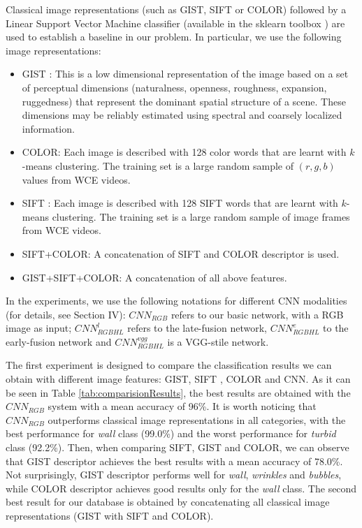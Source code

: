 \documentclass[review,12pt,3p]{elsarticle}
\begin{document}
Classical image representations (such as GIST, SIFT or COLOR) followed by a Linear Support Vector Machine classifier (available in the sklearn toolbox \cite{scikit-learn}) are used to establish a baseline in our problem. In particular, we use the following image representations:
\begin{itemize}
\item GIST \cite{oliva2001modeling}:  This is a low dimensional representation of the image based on a set of perceptual dimensions (naturalness, openness, roughness, expansion, ruggedness) that
represent the dominant spatial structure of a scene. These dimensions may be reliably estimated using spectral and coarsely localized information.
\item COLOR: Each image is described with 128 color words that are learnt with $k$-means clustering. The training set is a large random sample of $(r,g,b)$ values from WCE videos. 
\item SIFT \cite{Lowe_sift}: Each image is described with 128 SIFT words that are learnt with $k$-means clustering. The training set is a large random sample of image frames from WCE videos.
\item SIFT+COLOR: A concatenation of SIFT and COLOR descriptor is used.
\item GIST+SIFT+COLOR: A concatenation of all above features.
\end{itemize}

In the experiments, we use the following notations for different CNN modalities (for details, see Section IV): $CNN_{RGB}$ refers to our basic network, with a RGB image as input; $CNN^l_{RGBHL}$ refers to the late-fusion network, $CNN^e_{RGBHL}$ to the early-fusion network and $CNN^{vgg}_{RGBHL}$ is a VGG-stile network. 

The first experiment is designed to compare the classification results we can obtain with different image features: GIST, SIFT , COLOR and CNN.  As it can be seen in Table \ref{tab:comparisionResults}, the best results are obtained with the $CNN_{RGB}$ system with a mean accuracy of 96\%. It is worth noticing that $CNN_{RGB}$ outperforms classical image representations in all categories, with the best performance for \emph{wall} class (99.0\%) and the worst performance for \emph{turbid} class (92.2\%). Then, when comparing SIFT, GIST and COLOR, we can observe that GIST descriptor achieves the best results with a mean accuracy of 78.0\%. Not surprisingly, GIST descriptor performs well for \emph{wall}, \emph{wrinkles} and \emph{bubbles}, while COLOR descriptor achieves good results only for the \emph{wall} class. The second best result for our database is obtained by concatenating all classical image representations (GIST with SIFT and COLOR).
\end{document}
